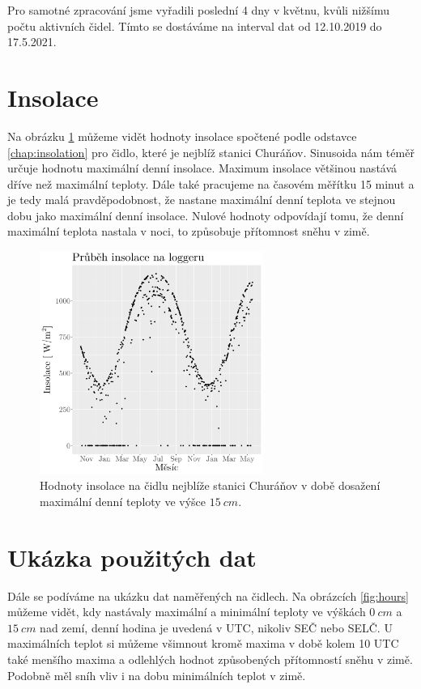 Pro samotné zpracování jsme vyřadili poslední 4 dny v květnu, kvůli nižšímu počtu aktivních čidel. Tímto se dostáváme na interval dat od 12.10.2019 do 17.5.2021.

\section{Insolace}
Na obrázku \ref{fig:insolacelogger} můžeme vidět hodnoty insolace spočtené podle odstavce \ref{chap:insolation} pro čidlo, které je nejblíž stanici Churáňov. Sinusoida nám téměř určuje hodnotu maximální denní insolace. Maximum insolace většinou nastává dříve než maximální teploty. Dále také pracujeme na časovém měřítku 15 minut a je tedy malá pravděpodobnost, že nastane maximální denní teplota ve stejnou dobu jako maximální denní insolace. Nulové hodnoty odpovídají tomu, že denní maximální teplota nastala v noci, to způsobuje přítomnost sněhu v zimě.

\begin{figure}
	\centering
	\includegraphics[width=0.65\textwidth]{img/ch2/insolation_max15cmNPS_4311_D_TMS.png}
	\caption{Hodnoty insolace na čidlu nejblíže stanici Churáňov v době dosažení maximální denní teploty ve výšce $\SI{15}{cm}$.}
	\label{fig:insolacelogger}
\end{figure}

\section{Ukázka použitých dat}\label{chap:showingoffdata}
Dále se podíváme na ukázku dat naměřených na čidlech. Na obrázcích \ref{fig:hours} můžeme vidět, kdy nastávaly maximální a minimální teploty ve výškách $\SI{0}{cm}$ a $\SI{15}{cm}$ nad zemí, denní hodina je uvedená v UTC, nikoliv SEČ nebo SELČ. U maximálních teplot si můžeme všimnout kromě maxima v době kolem 10 UTC také menšího maxima a odlehlých hodnot způsobených přítomností sněhu v zimě. Podobně měl sníh vliv i na dobu minimálních teplot v zimě.

